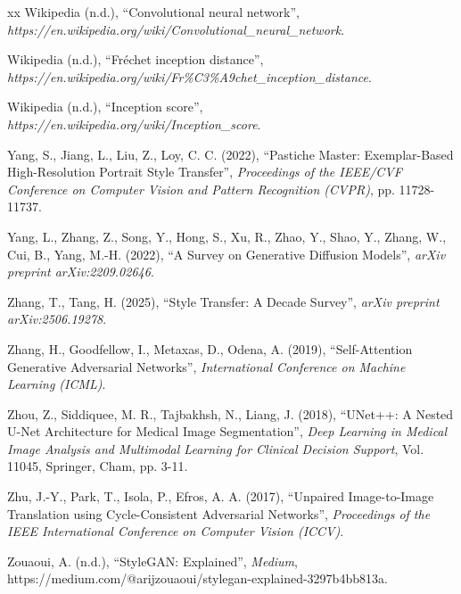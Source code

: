 \begin{thebibliography}{xx}
Wikipedia (n.d.), ``Convolutional neural network'', {\em https://en.wikipedia.org/wiki/Convolutional\_neural\_network}.

Wikipedia (n.d.), ``Fréchet inception distance'', {\em https://en.wikipedia.org/wiki/Fr\%C3\%A9chet\_inception\_distance}.

Wikipedia (n.d.), ``Inception score'', {\em https://en.wikipedia.org/wiki/Inception\_score}.

Yang, S., Jiang, L., Liu, Z., Loy, C. C. (2022), ``Pastiche Master: Exemplar-Based High-Resolution Portrait Style Transfer'', {\em Proceedings of the IEEE/CVF Conference on Computer Vision and Pattern Recognition (CVPR)}, pp. 11728-11737.

Yang, L., Zhang, Z., Song, Y., Hong, S., Xu, R., Zhao, Y., Shao, Y., Zhang, W., Cui, B., Yang, M.-H. (2022), ``A Survey on Generative Diffusion Models'', {\em arXiv preprint arXiv:2209.02646}.

Zhang, T., Tang, H. (2025), ``Style Transfer: A Decade Survey'', {\em arXiv preprint arXiv:2506.19278}.

Zhang, H., Goodfellow, I., Metaxas, D., Odena, A. (2019), ``Self-Attention Generative Adversarial Networks'', {\em International Conference on Machine Learning (ICML)}.

Zhou, Z., Siddiquee, M. R., Tajbakhsh, N., Liang, J. (2018), ``UNet++: A Nested U-Net Architecture for Medical Image Segmentation'', {\em Deep Learning in Medical Image Analysis and Multimodal Learning for Clinical Decision Support}, Vol. 11045, Springer, Cham, pp. 3-11.

Zhu, J.-Y., Park, T., Isola, P., Efros, A. A. (2017), ``Unpaired Image-to-Image Translation using Cycle-Consistent Adversarial Networks'', {\em Proceedings of the IEEE International Conference on Computer Vision (ICCV)}.

Zouaoui, A. (n.d.), ``StyleGAN: Explained'', {\em Medium}, https://medium.com/@arijzouaoui/stylegan-explained-3297b4bb813a.

\end{thebibliography}
